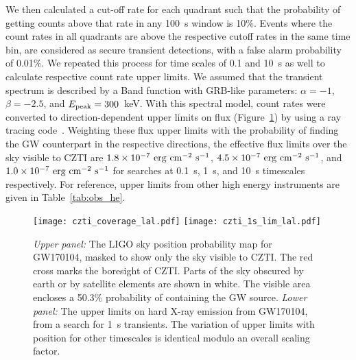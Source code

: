 \documentclass[twocolumn]{aastex6}
\begin{document}
We then calculated a cut-off rate for each quadrant such that the probability of getting counts above that rate in any 100~s window is 10\%.
Events where the count rates in all quadrants are above the respective cutoff rates in the same time bin, are considered as secure transient detections, with a false alarm probability of 0.01\%. We repeated this process for time scales of 0.1 and 10~s as well to calculate respective count rate upper limits. We assumed that the transient spectrum is described by a Band function with GRB-like parameters: $\alpha = -1$, $\beta = -2.5$, and $E_{\rm peak} = 300$~keV. With this spectral model, count rates were converted to direction-dependent upper limits on flux (Figure~\ref{fig:czti_coverage}) by using a ray tracing code~\citep{rch+16}. Weighting these flux upper limits with the probability of finding the GW counterpart in the respective directions, the effective flux limits over the sky visible to CZTI are $1.8 \times 10^{-7}~{\rm erg~cm}^{-2}{\rm~s}^{-1}$,  $4.5 \times 10^{-7}~{\rm erg~cm}^{-2}{\rm~s}^{-1}$, and $1.0 \times 10^{-7}~{\rm erg~cm}^{-2}{\rm~s}^{-1}$ for searches at 0.1~s, 1~s, and 10~s timescales respectively.
For reference, upper limits from other high energy instruments are given in Table~\ref{tab:obs_he}.


\begin{figure}[htb]
\texttt{[image: czti\_coverage\_lal.pdf]}
\texttt{[image: czti\_1s\_lim\_lal.pdf]}
\caption{\textit{Upper panel:} The LIGO sky position probability map for GW170104, masked to show only the sky visible to CZTI. The red cross marks the boresight of CZTI. Parts of the sky obscured by earth or by satellite elements are shown in white. The visible area encloses a 50.3\% probability of containing the GW source.
\textit{Lower panel:} The upper limits on hard X-ray emission from GW170104, from a search for 1~s transients. The variation of upper limits with position for other timescales is identical modulo an overall scaling factor.}
\label{fig:czti_coverage}
\end{figure}

\end{document}
